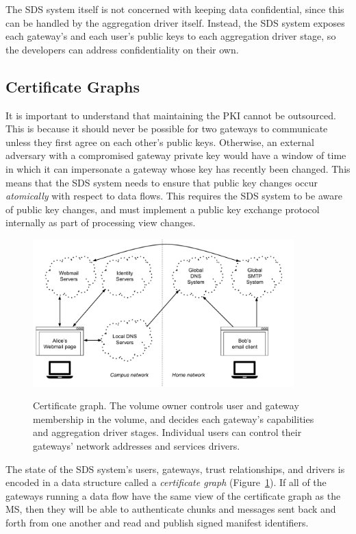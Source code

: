 The SDS system itself is not concerned with keeping data
confidential, since this can be handled by the aggregation driver itself.
Instead, the SDS system exposes each gateway's and each user's public keys to
each aggregation driver stage, so the developers can address confidentiality on their own.

\subsection{Certificate Graphs}

It is important to understand that maintaining the PKI cannot be outsourced.
This is because it should never be possible for two
gateways to communicate unless they first agree on each other's public keys.
Otherwise, an external adversary with a compromised gateway private key
would have a window of time in which it can
impersonate a gateway whose key has recently been changed.  This means that the
SDS system needs to ensure that public key changes occur \emph{atomically} with respect
to data flows.  This requires the SDS system to be aware of public key changes,
and must implement a public key exchange protocol internally as part of
processing view changes.

\begin{figure}[h!]
   \caption{Certificate graph.  The volume owner controls user and gateway
   membership in the volume, and decides each gateway's capabilities and
   aggregation driver stages.  Individual users can control their gateways'
   network addresses and services drivers.}
   \centering
   \includegraphics[width=0.9\textwidth,page=13]{figures/dissertation-figures}
   \label{fig:chap2-certificate-graph}
\end{figure}

The state of the SDS system's users, gateways, trust relationships, and drivers
is encoded in a data structure called a \emph{certificate graph}
(Figure~\ref{fig:chap2-certificate-graph}).  If all
of the gateways running a data flow have the same view of the certificate graph
as the MS, then they will be able to authenticate chunks and messages sent back and forth from one another
and read and publish signed manifest identifiers.

